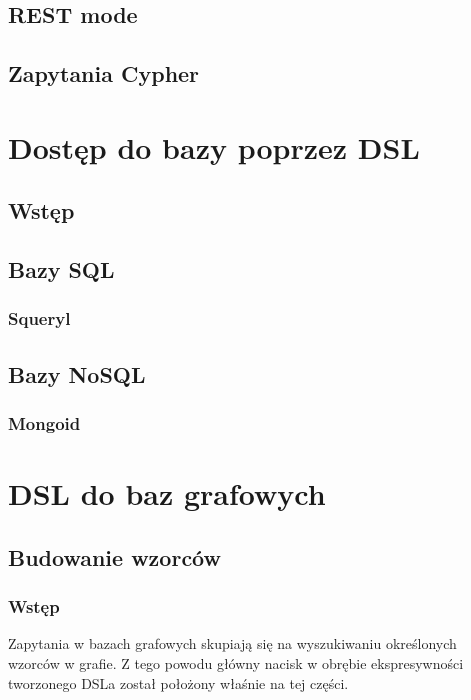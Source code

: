 \documentclass[brudnopis]{xmgr}
\begin{document}
\section{REST mode}

\section{Zapytania Cypher}

\chapter{Dostęp do bazy poprzez DSL}

\section{Wstęp}

\section{Bazy SQL}

\subsection{Squeryl}

\section{Bazy NoSQL}

\subsection{Mongoid}

\chapter{DSL do baz grafowych}

\section{Budowanie wzorców}

\subsection{Wstęp}

Zapytania w bazach grafowych skupiają się na wyszukiwaniu określonych wzorców w grafie. Z tego powodu główny nacisk w obrębie ekspresywności tworzonego DSLa został położony właśnie na tej części.
\end{document}
